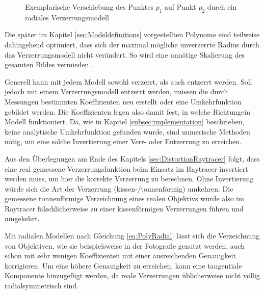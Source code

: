 \begin{figure}[h]
	\centering
	
	\caption{Exemplarische Verschiebung des Punktes $p_1$ auf Punkt $p_2$ durch ein radiales Verzerrungsmodell}
	\label{fig:DistExample}
\end{figure}

Die später im Kapitel \ref{sec:Modeldefinitions} vorgestellten Polynome sind teilweise dahingehend optimiert, dass sich der maximal mögliche unverzerrte Radius durch das Verzerrungsmodell nicht verändert. So wird eine unnötige Skalierung des gesamten Bildes vermieden \cite{ScalePreservingLensDistortion}.

Generell kann mit jedem Modell sowohl verzerrt, als auch entzerrt werden. Soll jedoch mit einem Verzerrungsmodell entzerrt werden, müssen die durch Messungen bestimmten Koeffizienten neu erstellt oder eine Umkehrfunktion gebildet werden. Die Koeffizienten legen also damit fest, in welche \glqq Richtung\grqq{ }ein Modell funktioniert. Da, wie in Kapitel \ref{subsec:implementation} beschrieben, keine analytische Umkehrfunktion gefunden wurde, sind numerische Methoden nötig, um eine solche Invertierung einer Verr- oder Entzerrung zu erreichen. 

Aus den Überlegungen am Ende des Kapitels \ref{sec:DistortionRaytracer} folgt, dass eine real gemessene Verzerrungsfunktion beim Einsatz im Raytracer invertiert werden muss, um hier die korrekte Verzerrung zu berechnen. Ohne Invertierung würde sich die Art der Verzerrung (kissen-/tonnenförmig) umkehren. Die gemessene tonnenförmige Verzeichnung eines realen Objektivs würde also im Raytracer fälschlicherweise zu einer kissenförmigen Verzerrungen führen und umgekehrt.

Mit radialen Modellen nach Gleichung \ref{eq:PolyRadial} lässt sich die Verzeichnung von Objektiven, wie sie beispielsweise in der Fotografie genutzt werden, auch schon mit sehr wenigen Koeffizienten mit einer ausreichenden Genauigkeit korrigieren. Um eine höhere Genauigkeit zu erreichen, kann eine tangentiale Komponente hinzugefügt werden, da reale Verzerrungen üblicherweise nicht völlig radialsymmetrisch sind.